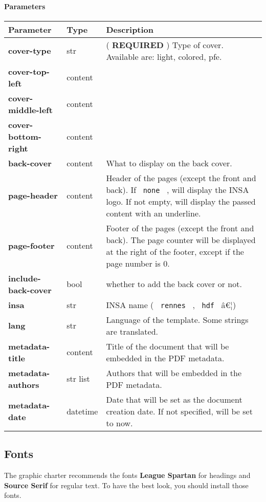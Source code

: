 \paragraph{Parameters}\label{parameters-2}

\begin{longtable}[]{@{}lll@{}}
\toprule\noalign{}
\textbf{Parameter} & Type & Description \\
\midrule\noalign{}
\endhead
\bottomrule\noalign{}
\endlastfoot
\textbf{cover-type} & str & ( \textbf{REQUIRED} ) Type of cover.
Available are: light, colored, pfe. \\
\textbf{cover-top-left} & content & \\
\textbf{cover-middle-left} & content & \\
\textbf{cover-bottom-right} & content & \\
\textbf{back-cover} & content & What to display on the back cover. \\
\textbf{page-header} & content & Header of the pages (except the front
and back). If \texttt{\ none\ } , will display the INSA logo. If not
empty, will display the passed content with an underline. \\
\textbf{page-footer} & content & Footer of the pages (except the front
and back). The page counter will be displayed at the right of the
footer, except if the page number is 0. \\
\textbf{include-back-cover} & bool & whether to add the back cover or
not. \\
\textbf{insa} & str & INSA name ( \texttt{\ rennes\ } , \texttt{\ hdf\ }
â€¦) \\
\textbf{lang} & str & Language of the template. Some strings are
translated. \\
\textbf{metadata-title} & content & Title of the document that will be
embedded in the PDF metadata. \\
\textbf{metadata-authors} & str list & Authors that will be embedded in
the PDF metadata. \\
\textbf{metadata-date} & datetime & Date that will be set as the
document creation date. If not specified, will be set to now. \\
\end{longtable}

\subsection{Fonts}\label{fonts}

The graphic charter recommends the fonts \textbf{League Spartan} for
headings and \textbf{Source Serif} for regular text. To have the best
look, you should install those fonts.

